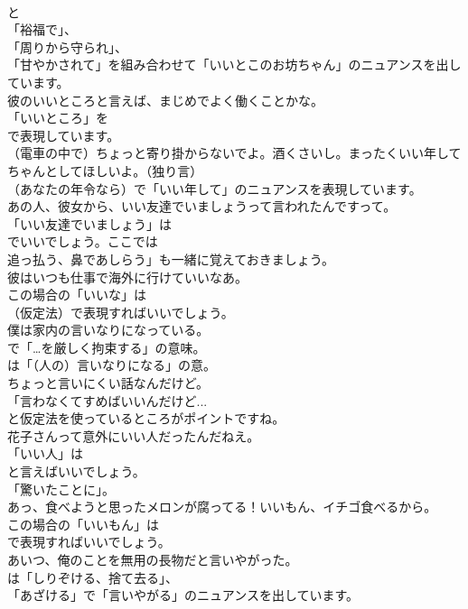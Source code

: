 \documentclass[8pt]{extreport}
\begin{document}
\begin{CJK}{UTF8}{min}
\\	と
\\	「裕福で」、
\\	「周りから守られ」、
\\	「甘やかされて」を組み合わせて「いいとこのお坊ちゃん」のニュアンスを出しています。	
\\	彼のいいところと言えば、まじめでよく働くことかな。 
\\	「いいところ」を 
\\	で表現しています。	
\\	（電車の中で）ちょっと寄り掛からないでよ。酒くさいし。まったくいい年してちゃんとしてほしいよ。（独り言） 
\\	（あなたの年令なら）で「いい年して」のニュアンスを表現しています。	
\\	あの人、彼女から、いい友達でいましょうって言われたんですって。 
\\	「いい友達でいましょう」は
\\	でいいでしょう。ここでは
\\	追っ払う、鼻であしらう」も一緒に覚えておきましょう。	
\\	彼はいつも仕事で海外に行けていいなあ。 
\\	この場合の「いいな」は
\\	（仮定法）で表現すればいいでしょう。	
\\	僕は家内の言いなりになっている。 
\\	で「…を厳しく拘束する」の意味。
\\	は「（人の）言いなりになる」の意。	
\\	ちょっと言いにくい話なんだけど。 
\\	「言わなくてすめばいいんだけど... 
\\	と仮定法を使っているところがポイントですね。	
\\	花子さんって意外にいい人だったんだねえ。 
\\	「いい人」は
\\	と言えばいいでしょう。
\\	「驚いたことに」。	
\\	あっ、食べようと思ったメロンが腐ってる！いいもん、イチゴ食べるから。 
\\	この場合の「いいもん」は 
\\	で表現すればいいでしょう。	
\\	あいつ、俺のことを無用の長物だと言いやがった。 
\\	は「しりぞける、捨て去る」、
\\	「あざける」で「言いやがる」のニュアンスを出しています。	

\end{CJK}
\end{document}
